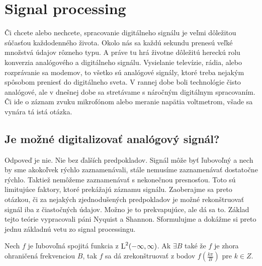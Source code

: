 \section{Signal processing}
Či chcete alebo nechcete, spracovanie digitálneho signálu je veľmi dôležitou
súčasťou každodenného života. Okolo nás sa každú sekundu prenesú veľké
množstvá údajov rôzneho typu. A práve tu hrá životne dôležitú hereckú
rolu konverzia analógového a digitálneho signálu. Vysielanie
televízie, rádia, alebo rozprávanie sa modemov, to všetko sú analógové
signály, ktoré treba nejakým spôsobom preniesť do digitálneho sveta. V
rannej dobe boli technológie čisto analógové, ale v dnešnej dobe sa
stretávame s náročným digitálnym spracovaním. Či ide o záznam zvuku
mikrofónom alebo meranie napätia voltmetrom, všade sa vynára tá istá
otázka.

\subsection{Je možné digitalizovať analógový signál?}
Odpoveď je nie. Nie bez ďalších predpokladov. Signál môže byť
ľubovoľný a nech by sme akokoľvek rýchlo zaznamenávali, stále nemusíme
zaznamenávať dostatočne rýchlo. Taktiež nemôžeme zaznamenávať s
nekonečnou presnosťou. Toto sú limitujúce faktory, ktoré prekážajú
záznamu signálu. Zaoberajme sa preto otázkou, či za nejakých
zjednodušených predpokladov je možné rekonštruovať signál iba z
čiastočných údajov. Možno je to prekvapujúce, ale dá sa to. Základ
tejto teórie vypracovali páni Nyquist a Shannon. Sformulujme a dokážme
si preto jednu základnú vetu zo signal processingu.

\begin{veta}
    Nech $f$ je ľubovoľná spojitá funkcia z $\mbox{L}^2(-\infty,\infty)$. 
    Ak $\exists B$ také že $f$ je zhora ohraničená frekvenciou $B$,
    tak $f$ sa dá zrekonštruovať z bodov $f(\frac{k\pi}{B})$ pre
    $k\in Z$. 
\end{veta}

